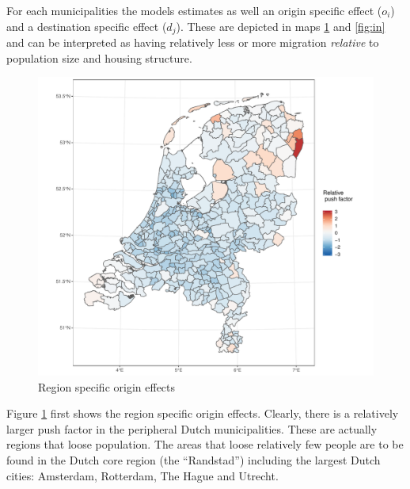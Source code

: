 \documentclass[fleqn,10pt]{SelfArx} %
\begin{document}
{{For each municipalities the models estimates as well an origin specific effect ($o_i$) and a destination specific effect ($d_j$). These are depicted in maps \ref{fig:out} and \ref{fig:in} and can be interpreted as having relatively less or more migration \emph{relative} to population size and housing structure.

\begin{figure}[h!]
		\centering
		\includegraphics[width = \columnwidth]{../fig/p_coef_out.pdf}
		\caption{Region specific origin effects}\label{fig:out}
\end{figure}

Figure \ref{fig:out} first shows the region specific origin effects. Clearly, there is a relatively larger push factor in the peripheral Dutch municipalities. These are actually regions that loose population. The areas that loose relatively few people are to be found in the Dutch core region (the ``Randstad'') including the largest Dutch cities: Amsterdam, Rotterdam, The Hague and Utrecht.  

}}
\end{document}
